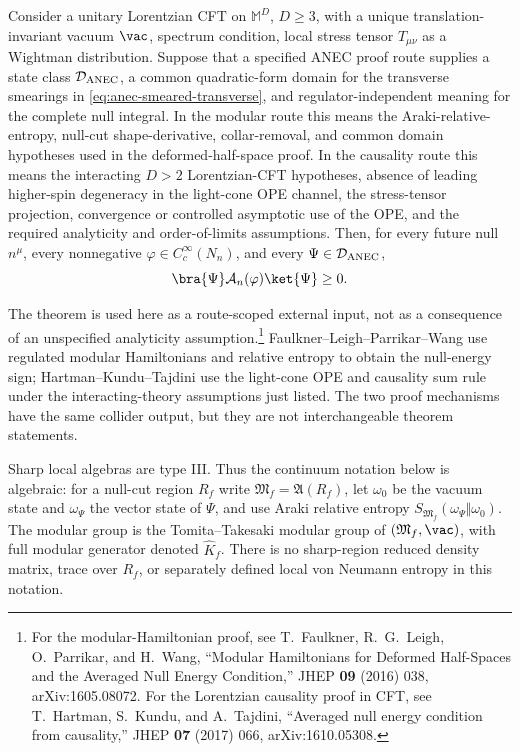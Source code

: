 \begin{quotedtheorem}
\label{qthm:anec-cft}
Consider a unitary Lorentzian CFT on \(\mathbb M^D\), \(D\geq3\), with a
unique translation-invariant vacuum \(\vac\), spectrum condition, local
stress tensor \(T_{\mu\nu}\) as a Wightman distribution.  Suppose that a
specified ANEC proof route supplies a state class
\(\mathcal D_{\rm ANEC}\), a common quadratic-form domain for the transverse
smearings in \eqref{eq:anec-smeared-transverse}, and regulator-independent
meaning for the complete null integral.  In the modular route this means the
Araki-relative-entropy, null-cut shape-derivative, collar-removal, and common
domain hypotheses used in the deformed-half-space proof.  In the causality
route this means the interacting \(D>2\) Lorentzian-CFT hypotheses, absence of
leading higher-spin degeneracy in the light-cone OPE channel, the
stress-tensor projection, convergence or controlled asymptotic use of the OPE,
and the required analyticity and order-of-limits assumptions.  Then, for every
future null \(n^\mu\), every nonnegative
\(\varphi\in C_c^\infty(N_n)\), and every
\(\Psi\in\mathcal D_{\rm ANEC}\),
\begin{equation}
  \bra{\Psi}\mathcal A_n(\varphi)\ket{\Psi}\geq0 .
  \label{eq:anec-positivity}
\end{equation}
\end{quotedtheorem}

The theorem is used here as a route-scoped external input, not as a consequence
of an unspecified analyticity assumption.\footnote{For the
modular-Hamiltonian proof, see
T.~Faulkner, R.~G.~Leigh, O.~Parrikar, and H.~Wang, ``Modular Hamiltonians
for Deformed Half-Spaces and the Averaged Null Energy Condition,''
JHEP \textbf{09} (2016) 038, arXiv:1605.08072.  For the Lorentzian
causality proof in CFT, see T.~Hartman, S.~Kundu, and A.~Tajdini,
``Averaged null energy condition from causality,'' JHEP \textbf{07} (2017)
066, arXiv:1610.05308.}
Faulkner--Leigh--Parrikar--Wang use regulated modular Hamiltonians and
relative entropy to obtain the null-energy sign; Hartman--Kundu--Tajdini use
the light-cone OPE and causality sum rule under the interacting-theory
assumptions just listed.  The two proof mechanisms have the same collider
output, but they are not interchangeable theorem statements.

Sharp local algebras are type III.  Thus the continuum notation below is
algebraic: for a null-cut region \(R_f\) write
\(\mathfrak M_f=\mathfrak A(R_f)\), let
\(\omega_0\) be the vacuum state and \(\omega_\Psi\) the vector state of
\(\Psi\), and use Araki relative entropy
\(S_{\mathfrak M_f}(\omega_\Psi\Vert\omega_0)\).  The modular group is the
Tomita--Takesaki modular group of \((\mathfrak M_f,\vac)\), with full modular
generator denoted \(\widehat K_f\).  There is no sharp-region reduced density
matrix, trace over \(R_f\), or separately defined local von Neumann entropy in
this notation.

